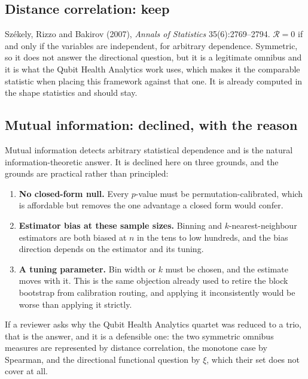 \documentclass[11pt,a4paper]{article}
\begin{document}
\subsection{Distance correlation: keep}

Székely, Rizzo and Bakirov (2007), \emph{Annals of Statistics} 35(6):2769--2794.
$\mathcal{R} = 0$ if and only if the variables are independent, for arbitrary dependence.
Symmetric, so it does not answer the directional question, but it is a legitimate
omnibus and it is what the Qubit Health Analytics work uses, which makes it the
comparable statistic when placing this framework against that one. It is already computed
in the shape statistics and should stay.

\subsection{Mutual information: declined, with the reason}

Mutual information detects arbitrary statistical dependence and is the natural
information-theoretic answer. It is declined here on three grounds, and the grounds are
practical rather than principled:

\begin{enumerate}[leftmargin=1.6em,itemsep=2pt]
\item \textbf{No closed-form null.} Every $p$-value must be permutation-calibrated, which
is affordable but removes the one advantage a closed form would confer.
\item \textbf{Estimator bias at these sample sizes.} Binning and $k$-nearest-neighbour
estimators are both biased at $n$ in the tens to low hundreds, and the bias direction
depends on the estimator and its tuning.
\item \textbf{A tuning parameter.} Bin width or $k$ must be chosen, and the estimate moves
with it. This is the same objection already used to retire the block bootstrap from
calibration routing, and applying it inconsistently would be worse than applying it
strictly.
\end{enumerate}

\noindent
If a reviewer asks why the Qubit Health Analytics quartet was reduced to a trio, that is
the answer, and it is a defensible one: the two symmetric omnibus measures are
represented by distance correlation, the monotone case by Spearman, and the directional
functional question by $\xi$, which their set does not cover at all.

\end{document}
